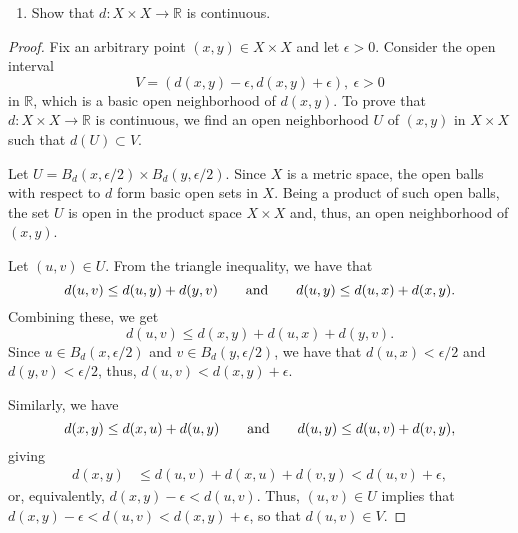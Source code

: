 \documentclass[a4paper,10pt]{article}
\newcommand{\RR}{\mathbb{R}}
\begin{document}
\begin{solution}
    \begin{enumerate}[label={(\alph*)}, align=left, leftmargin=\parindent, listparindent=\parindent, labelwidth=0pt, itemindent=!]
        \item Show that $d: X \times X \rightarrow \RR$ is continuous.
    \end{enumerate}
    \begin{proof}
        Fix an arbitrary point $(x, y) \in X \times X$ and let $\epsilon > 0$.
        Consider the open interval
        \begin{equation*}
            V = (d(x, y) - \epsilon, d(x, y) + \epsilon),~ \epsilon > 0
        \end{equation*}
        in $\RR$, which is a basic open neighborhood of $d(x, y)$.  
        To prove that $d: X \times X \rightarrow \RR$ is continuous, we find an open neighborhood $U$ of $(x, y)$ in $X \times X$ such that $d(U) \subset V$.

        Let $U = B_d(x, \epsilon/2) \times B_d(y, \epsilon/2)$.
        Since $X$ is a metric space, the open balls with respect to $d$ form basic open sets in $X$.
        Being a product of such open balls, the set $U$ is open in the product space $X \times X$ and, thus, an open neighborhood of $(x, y)$.

        Let $(u, v) \in U$.
        From the triangle inequality, we have that
        \begin{equation*}
            d(u, v) \leq d(u, y) + d(y, v)\qquad {\rm and }\qquad d(u, y) \leq d(u, x) + d(x, y).
        \end{equation*}
        Combining these, we get
        \begin{equation*}
            d(u, v) \leq d(x, y) + d(u, x) + d(y, v).
        \end{equation*}
        Since $u \in B_d(x, \epsilon/2)$ and $v \in B_d(y, \epsilon/2)$, we have that $d(u, x) < \epsilon/2$ and $d(y, v) < \epsilon/2$, thus, $d(u, v) < d(x, y) + \epsilon$.

        Similarly, we have
        \begin{equation*}
            d(x, y) \leq d(x, u) + d(u, y)\qquad {\rm and }\qquad d(u, y) \leq d(u, v) + d(v, y),
        \end{equation*}
        giving
        \begin{align*}
            d(x, y) &\leq d(u, v) + d(x, u) + d(v, y) < d(u, v) + \epsilon,
        \end{align*}
        or, equivalently, $d(x, y) - \epsilon < d(u, v)$.
        Thus, $(u, v) \in U$ implies that $d(x, y) - \epsilon < d(u, v) < d(x, y) + \epsilon$, so that $d(u, v) \in V$.


\end{proof}
\end{solution}
\end{document}
